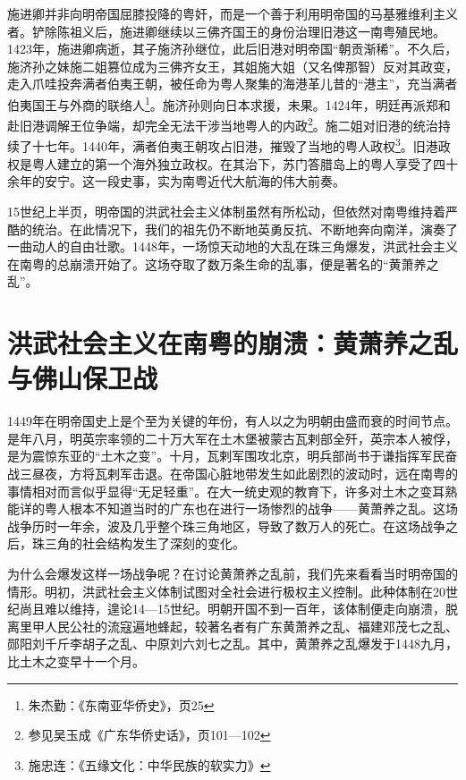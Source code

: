 施进卿并非向明帝国屈膝投降的粤奸，而是一个善于利用明帝国的马基雅维利主义者。铲除陈祖义后，施进卿继续以三佛齐国王的身份治理旧港这一南粤殖民地。1423年，施进卿病逝，其子施济孙继位，此后旧港对明帝国“朝贡渐稀”。不久后，施济孙之妹施二姐篡位成为三佛齐女王，其姐施大姐（又名俾那智）反对其政变，走入爪哇投奔满者伯夷王朝，被任命为粤人聚集的海港革儿昔的“港主”，充当满者伯夷国王与外商的联络人\footnote{朱杰勤：《东南亚华侨史》，页25}。施济孙则向日本求援，未果。1424年，明廷再派郑和赴旧港调解王位争端，却完全无法干涉当地粤人的内政\footnote{参见吴玉成《广东华侨史话》，页101—102}。施二姐对旧港的统治持续了十七年。1440年，满者伯夷王朝攻占旧港，摧毁了当地的粤人政权\footnote{施忠连：《五缘文化：中华民族的软实力》}。旧港政权是粤人建立的第一个海外独立政权。在其治下，苏门答腊岛上的粤人享受了四十余年的安宁。这一段史事，实为南粤近代大航海的伟大前奏。

15世纪上半页，明帝国的洪武社会主义体制虽然有所松动，但依然对南粤维持着严酷的统治。在此情况下，我们的祖先仍不断地英勇反抗、不断地奔向南洋，演奏了一曲动人的自由壮歌。1448年，一场惊天动地的大乱在珠三角爆发，洪武社会主义在南粤的总崩溃开始了。这场夺取了数万条生命的乱事，便是著名的“黄萧养之乱”。

\section{洪武社会主义在南粤的崩溃：黄萧养之乱与佛山保卫战}

1449年在明帝国史上是个至为关键的年份，有人以之为明朝由盛而衰的时间节点。是年八月，明英宗率领的二十万大军在土木堡被蒙古瓦剌部全歼，英宗本人被俘，是为震惊东亚的“土木之变”。十月，瓦剌军围攻北京，明兵部尚书于谦指挥军民奋战三昼夜，方将瓦剌军击退。在帝国心脏地带发生如此剧烈的波动时，远在南粤的事情相对而言似乎显得“无足轻重”。在大一统史观的教育下，许多对土木之变耳熟能详的粤人根本不知道当时的广东也在进行一场惨烈的战争——黄萧养之乱。这场战争历时一年余，波及几乎整个珠三角地区，导致了数万人的死亡。在这场战争之后，珠三角的社会结构发生了深刻的变化。

为什么会爆发这样一场战争呢？在讨论黄萧养之乱前，我们先来看看当时明帝国的情形。明初，洪武社会主义体制试图对全社会进行极权主义控制。此种体制在20世纪尚且难以维持，遑论14—15世纪。明朝开国不到一百年，该体制便走向崩溃，脱离里甲人民公社的流寇遍地蜂起，较著名者有广东黄萧养之乱、福建邓茂七之乱、郧阳刘千斤李胡子之乱、中原刘六刘七之乱。其中，黄萧养之乱爆发于1448九月，比土木之变早十一个月。

